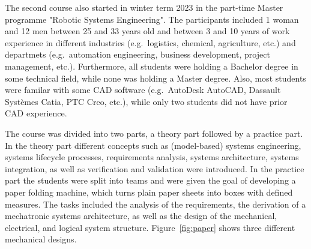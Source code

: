 \documentclass{PDS}
\begin{document}
The second course also started in winter term 2023 in the part-time Master programme "Robotic Systems Engineering".
The participants included 1 woman and 12 men between 25 and 33 years old and between 3 and 10 years of work experience in different industries (e.g.\ logistics, chemical, agriculture, etc.) and departmets (e.g.\ automation engineering, business development, project management, etc.).
Furthermore, all students were holding a Bachelor degree in some technical field, while none was holding a Master degree.
Also, most students were familar with some CAD software (e.g.\ AutoDesk AutoCAD, Dassault Systèmes Catia, PTC Creo, etc.), while only two students did not have prior CAD experience.

The course was divided into two parts, a theory part followed by a practice part.
In the theory part different concepts such as (model-based) systems engineering, systems lifecycle processes, requirements analysis, systems architecture, systems integration, as well as verification and validation were introduced.
In the practice part the students were split into teams and were given the goal of developing a paper folding machine, which turns plain paper sheets into boxes with defined measures.
The tasks included the analysis of the requirements, the derivation of a mechatronic systems architecture, as well as the design of the mechanical, electrical, and logical system structure.
Figure~\ref{fig:paper} shows three different mechanical designs.
\end{document}
